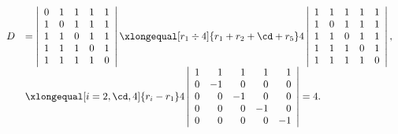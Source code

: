 \begin{jie}
$$
\begin{array}{rl}
  D &= \left|
      \begin{array}{rrrrr}
        0&1&1&1&1\\
        1&0&1&1&1\\
        1&1&0&1&1\\
        1&1&1&0&1\\
        1&1&1&1&0\\
      \end{array}
  \right|
  \xlongequal[r_1\div 4]{r_1+r_2+\cd+r_5}
  4 \left|
  \begin{array}{rrrrr}
    1&1&1&1&1\\
    1&0&1&1&1\\
    1&1&0&1&1\\
    1&1&1&0&1\\
    1&1&1&1&0\\
  \end{array}
  \right| , \\[0.3in]
    & \xlongequal[i=2,\cd, 4]{r_i-r_1}
      4 \left|
      \begin{array}{rrrrr}
        1&1&1&1&1\\
        0&-1&0&0&0\\
        0&0&-1&0&0\\
        0&0&0&-1&0\\
        0&0&0&0&-1\\
      \end{array}
  \right| = 4.
\end{array}
$$








\end{jie}

